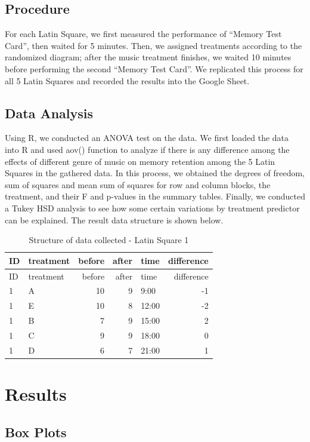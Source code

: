 \documentclass[]{article}
\begin{document}
\subsection{Procedure}\label{procedure}

For each Latin Square, we first measured the performance of ``Memory
Test Card'', then waited for 5 minutes. Then, we assigned treatments
according to the randomized diagram; after the music treatment finishes,
we waited 10 minutes before performing the second ``Memory Test Card''.
We replicated this process for all 5 Latin Squares and recorded the
results into the Google Sheet.

\subsection{Data Analysis}\label{data-analysis}

Using R, we conducted an ANOVA test on the data. We first loaded the
data into R and used aov() function to analyze if there is any
difference among the effects of different genre of music on memory
retention among the 5 Latin Squares in the gathered data. In this
process, we obtained the degrees of freedom, sum of squares and mean sum
of squares for row and column blocks, the treatment, and their F and
p-values in the summary tables. Finally, we conducted a Tukey HSD
analysis to see how some certain variations by treatment predictor can
be explained. The result data structure is shown below.

\begin{longtable}[]{@{}llrrlr@{}}
\caption{Structure of data collected - Latin Square 1}\tabularnewline
\toprule
ID & treatment & before & after & time & difference\tabularnewline
\midrule
\endfirsthead
\toprule
ID & treatment & before & after & time & difference\tabularnewline
\midrule
\endhead
1 & A & 10 & 9 & 9:00 & -1\tabularnewline
1 & E & 10 & 8 & 12:00 & -2\tabularnewline
1 & B & 7 & 9 & 15:00 & 2\tabularnewline
1 & C & 9 & 9 & 18:00 & 0\tabularnewline
1 & D & 6 & 7 & 21:00 & 1\tabularnewline
\bottomrule
\end{longtable}

\section{Results}\label{results}

\subsection{Box Plots}\label{box-plots}
\end{document}

